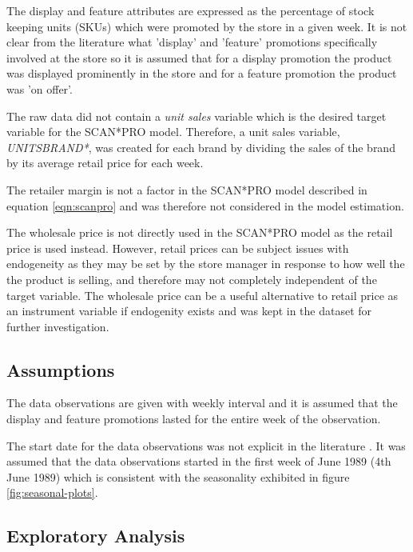 \documentclass[a4paper,11pt]{article}
\begin{document}
The display and feature attributes are expressed as the percentage of stock keeping units (SKUs) which were promoted by the store in a given week. It is not clear from the literature \citep{srinivasan_promotions_2004} what 'display' and 'feature' promotions specifically involved at the store so it is assumed that for a display promotion the product was displayed prominently in the store and for a feature promotion the product was 'on offer'. 

The raw data did not contain a \textit{unit sales} variable which is the desired target variable for the SCAN*PRO model. Therefore, a unit sales variable, \textit{UNITSBRAND*}, was created for each brand by dividing the sales of the brand by its average retail price for each week.

The retailer margin is not a factor in the SCAN*PRO model described in equation \ref{eqn:scanpro} and was therefore not considered in the model estimation.

The wholesale price is not directly used in the SCAN*PRO model as the retail price is used instead. However, retail prices can be subject issues with endogeneity as they may be set by the store manager in response to how well the the product is selling, and therefore may not completely independent of the target variable. The wholesale price can be a useful alternative to retail price as an instrument variable if endogenity exists and was kept in the dataset for further investigation.



\subsection{Assumptions}
The data observations are given with weekly interval and it is assumed that the display and feature promotions lasted for the entire week of the observation.

The start date for the data observations was not explicit in the literature \citep{srinivasan_promotions_2004}. It was assumed that the data observations started in the first week of June 1989 (4th June 1989) which is consistent with the seasonality exhibited in figure \ref{fig:seasonal-plots}.

\subsection{Exploratory Analysis}
\end{document}
